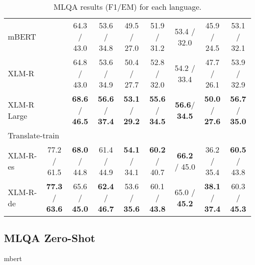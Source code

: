 \documentclass[11pt]{article}
\begin{document}
\begin{table*}[!ht]
\begin{adjustbox}{max width=\textwidth}
\begin{tabular}{l|ccccccc|c}
        \midrule
        mBERT & ~ & 64.3 / 43.0 & 53.6 / 34.8 & 49.5 / 27.0 & 51.9 / 31.2 & 53.4 / 32.0 & 45.9 / 24.5 & 53.1 / 32.1 \\
        XLM-R & ~ &64.8 / 43.0 & 53.6 / 34.9 & 50.4 / 27.7 & 52.8 / 32.0 & 54.2 / 33.4 & 47.7 / 26.1 & 53.9 / 32.9 \\
        XLM-R Large & ~ & \textbf{68.6} / \textbf{46.5} & \textbf{56.6} / \textbf{37.4} & \textbf{53.1} / \textbf{29.2} & \textbf{55.6} / \textbf{34.5} & \textbf{56.6}/ \textbf{34.5} & \textbf{50.0} / \textbf{27.6} & \textbf{56.7} / \textbf{35.0} \\
        \midrule
        \multicolumn{9}{l}{Translate-train} \\
        \midrule
        XLM-R-es &77.2 / 61.5 & \textbf{68.0} / 44.8 & 61.4 / 44.9 & \textbf{54.1} / 34.1 & \textbf{60.2} / 40.7 & \textbf{66.2} / 45.0 & 36.2 / 35.4 & \textbf{60.5} / 43.8 \\
        XLM-R-de & \textbf{77.3} / \textbf{63.6} & 65.6 / \textbf{45.0} & \textbf{62.4} / \textbf{46.7} & 53.6 / \textbf{35.6} & 60.1 / \textbf{43.8} & 65.0 / \textbf{45.2} & \textbf{38.1} / \textbf{37.4} & 60.3 / \textbf{45.3}\\
        \bottomrule
    \end{tabular}
    \end{adjustbox}
    \centering
    \caption{MLQA results (F1/EM) for each language.}
    \label{MLQA_results}
\end{table*}

\subsection{MLQA Zero-Shot}

mbert
\end{document}
